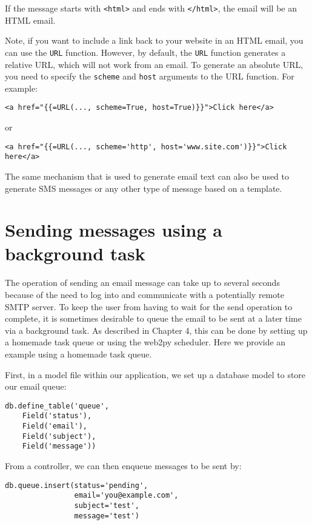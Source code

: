 \documentclass[justified,sixbynine,notoc]{tufte-book}
\def\ft{\small\tt}
\begin{document}
\begin{fullwidth}
If the message starts with {\ft <html>} and ends with {\ft </html>}, the email will be an HTML email.

Note, if you want to include a link back to your website in an HTML email, you can use the {\ft URL} function. However, by default, the {\ft URL} function generates a relative URL, which will not work from an email. To generate an absolute URL, you need to specify the {\ft scheme} and {\ft host} arguments to the URL function. For example:
\begin{lstlisting}[keywords={}]
<a href="{{=URL(..., scheme=True, host=True)}}">Click here</a>
\end{lstlisting}
\noindent or

\begin{lstlisting}[keywords={}]
<a href="{{=URL(..., scheme='http', host='www.site.com')}}">Click here</a>
\end{lstlisting}

The same mechanism that is used to generate email text can also be used to generate SMS messages or any other type of message based on a template.

\goodbreak\section{Sending messages using a background task}

The operation of sending an email message can take up to several seconds because of the need to log into and communicate with a potentially remote SMTP server. To keep the user from having to wait for the send operation to complete, it is sometimes desirable to queue the email to be sent at a later time via a background task. As described in Chapter 4, this can be done by setting up a homemade task queue or using the web2py scheduler. Here we provide an example using a homemade task queue.

First, in a model file within our application, we set up a database model to store our email queue:
\begin{lstlisting}
db.define_table('queue',
    Field('status'),
    Field('email'),
    Field('subject'),
    Field('message'))
\end{lstlisting}

From a controller, we can then enqueue messages to be sent by:
\begin{lstlisting}
db.queue.insert(status='pending',
                email='you@example.com',
                subject='test',
                message='test')
\end{lstlisting}


\end{fullwidth}
\end{document}
